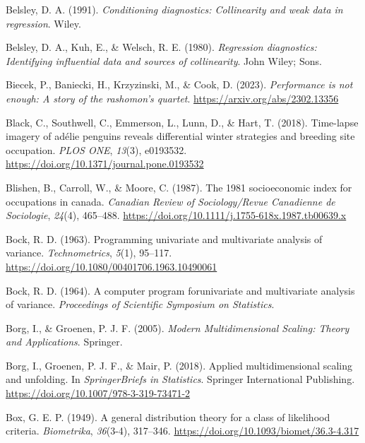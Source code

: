 \documentclass[
  letterpaper,
  10pt,
  krantz2]{krantz}
\newlength{\cslhangindent}
\newenvironment{CSLReferences}[2] %
 {\begin{list}{}{%
  \setlength{\itemindent}{0pt}
  \setlength{\leftmargin}{0pt}
  \setlength{\parsep}{0pt}
  \ifodd #1
   \setlength{\leftmargin}{\cslhangindent}
   \setlength{\itemindent}{-1\cslhangindent}
  \fi
  \setlength{\itemsep}{#2\baselineskip}}}
 {\end{list}}
\begin{document}
\begin{CSLReferences}{1}{0}
Belsley, D. A. (1991). \emph{Conditioning diagnostics: Collinearity and
weak data in regression}. Wiley.

Belsley, D. A., Kuh, E., \& Welsch, R. E. (1980). \emph{Regression
diagnostics: Identifying influential data and sources of collinearity}.
John Wiley; Sons.

Biecek, P., Baniecki, H., Krzyzinski, M., \& Cook, D. (2023).
\emph{Performance is not enough: A story of the rashomon's quartet}.
\url{https://arxiv.org/abs/2302.13356}

Black, C., Southwell, C., Emmerson, L., Lunn, D., \& Hart, T. (2018).
Time-lapse imagery of adélie penguins reveals differential winter
strategies and breeding site occupation. \emph{PLOS ONE}, \emph{13}(3),
e0193532. \url{https://doi.org/10.1371/journal.pone.0193532}

Blishen, B., Carroll, W., \& Moore, C. (1987). The 1981 socioeconomic
index for occupations in canada. \emph{Canadian Review of
Sociology/Revue Canadienne de Sociologie}, \emph{24}(4), 465--488.
\url{https://doi.org/10.1111/j.1755-618x.1987.tb00639.x}

Bock, R. D. (1963). Programming univariate and multivariate analysis of
variance. \emph{Technometrics}, \emph{5}(1), 95--117.
\url{https://doi.org/10.1080/00401706.1963.10490061}

Bock, R. D. (1964). A computer program forunivariate and multivariate
analysis of variance. \emph{Proceedings of Scientific Symposium on
Statistics}.

Borg, I., \& Groenen, P. J. F. (2005). \emph{{Modern Multidimensional
Scaling: Theory and Applications}}. Springer.

Borg, I., Groenen, P. J. F., \& Mair, P. (2018). Applied
multidimensional scaling and unfolding. In \emph{SpringerBriefs in
Statistics}. Springer International Publishing.
\url{https://doi.org/10.1007/978-3-319-73471-2}

Box, G. E. P. (1949). A general distribution theory for a class of
likelihood criteria. \emph{Biometrika}, \emph{36}(3-4), 317--346.
\url{https://doi.org/10.1093/biomet/36.3-4.317}


\end{CSLReferences}
\end{document}
